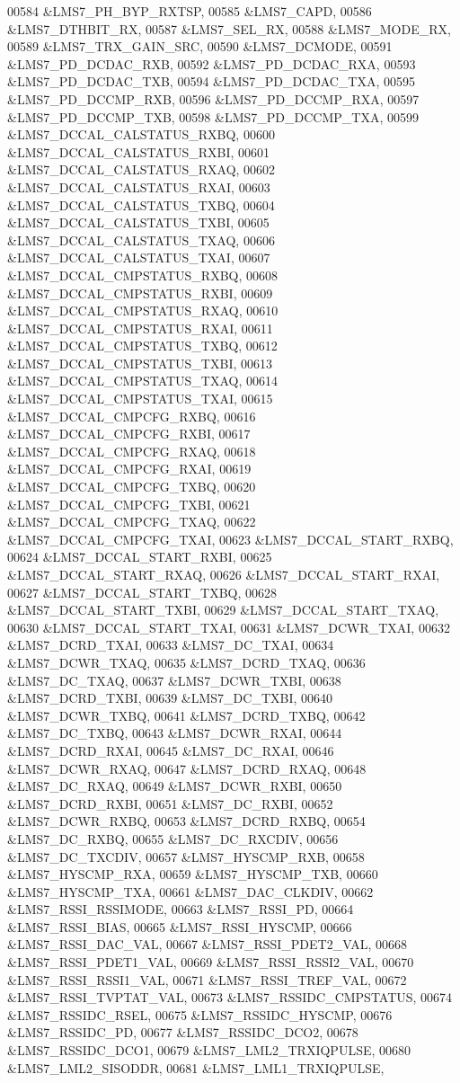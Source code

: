 \begin{DoxyCode}
00584 &LMS7_PH_BYP_RXTSP,
00585 &LMS7_CAPD,
00586 &LMS7_DTHBIT_RX,
00587 &LMS7_SEL_RX,
00588 &LMS7_MODE_RX,
00589 &LMS7_TRX_GAIN_SRC,
00590 &LMS7_DCMODE,
00591 &LMS7_PD_DCDAC_RXB,
00592 &LMS7_PD_DCDAC_RXA,
00593 &LMS7_PD_DCDAC_TXB,
00594 &LMS7_PD_DCDAC_TXA,
00595 &LMS7_PD_DCCMP_RXB,
00596 &LMS7_PD_DCCMP_RXA,
00597 &LMS7_PD_DCCMP_TXB,
00598 &LMS7_PD_DCCMP_TXA,
00599 &LMS7_DCCAL_CALSTATUS_RXBQ,
00600 &LMS7_DCCAL_CALSTATUS_RXBI,
00601 &LMS7_DCCAL_CALSTATUS_RXAQ,
00602 &LMS7_DCCAL_CALSTATUS_RXAI,
00603 &LMS7_DCCAL_CALSTATUS_TXBQ,
00604 &LMS7_DCCAL_CALSTATUS_TXBI,
00605 &LMS7_DCCAL_CALSTATUS_TXAQ,
00606 &LMS7_DCCAL_CALSTATUS_TXAI,
00607 &LMS7_DCCAL_CMPSTATUS_RXBQ,
00608 &LMS7_DCCAL_CMPSTATUS_RXBI,
00609 &LMS7_DCCAL_CMPSTATUS_RXAQ,
00610 &LMS7_DCCAL_CMPSTATUS_RXAI,
00611 &LMS7_DCCAL_CMPSTATUS_TXBQ,
00612 &LMS7_DCCAL_CMPSTATUS_TXBI,
00613 &LMS7_DCCAL_CMPSTATUS_TXAQ,
00614 &LMS7_DCCAL_CMPSTATUS_TXAI,
00615 &LMS7_DCCAL_CMPCFG_RXBQ,
00616 &LMS7_DCCAL_CMPCFG_RXBI,
00617 &LMS7_DCCAL_CMPCFG_RXAQ,
00618 &LMS7_DCCAL_CMPCFG_RXAI,
00619 &LMS7_DCCAL_CMPCFG_TXBQ,
00620 &LMS7_DCCAL_CMPCFG_TXBI,
00621 &LMS7_DCCAL_CMPCFG_TXAQ,
00622 &LMS7_DCCAL_CMPCFG_TXAI,
00623 &LMS7_DCCAL_START_RXBQ,
00624 &LMS7_DCCAL_START_RXBI,
00625 &LMS7_DCCAL_START_RXAQ,
00626 &LMS7_DCCAL_START_RXAI,
00627 &LMS7_DCCAL_START_TXBQ,
00628 &LMS7_DCCAL_START_TXBI,
00629 &LMS7_DCCAL_START_TXAQ,
00630 &LMS7_DCCAL_START_TXAI,
00631 &LMS7_DCWR_TXAI,
00632 &LMS7_DCRD_TXAI,
00633 &LMS7_DC_TXAI,
00634 &LMS7_DCWR_TXAQ,
00635 &LMS7_DCRD_TXAQ,
00636 &LMS7_DC_TXAQ,
00637 &LMS7_DCWR_TXBI,
00638 &LMS7_DCRD_TXBI,
00639 &LMS7_DC_TXBI,
00640 &LMS7_DCWR_TXBQ,
00641 &LMS7_DCRD_TXBQ,
00642 &LMS7_DC_TXBQ,
00643 &LMS7_DCWR_RXAI,
00644 &LMS7_DCRD_RXAI,
00645 &LMS7_DC_RXAI,
00646 &LMS7_DCWR_RXAQ,
00647 &LMS7_DCRD_RXAQ,
00648 &LMS7_DC_RXAQ,
00649 &LMS7_DCWR_RXBI,
00650 &LMS7_DCRD_RXBI,
00651 &LMS7_DC_RXBI,
00652 &LMS7_DCWR_RXBQ,
00653 &LMS7_DCRD_RXBQ,
00654 &LMS7_DC_RXBQ,
00655 &LMS7_DC_RXCDIV,
00656 &LMS7_DC_TXCDIV,
00657 &LMS7_HYSCMP_RXB,
00658 &LMS7_HYSCMP_RXA,
00659 &LMS7_HYSCMP_TXB,
00660 &LMS7_HYSCMP_TXA,
00661 &LMS7_DAC_CLKDIV,
00662 &LMS7_RSSI_RSSIMODE,
00663 &LMS7_RSSI_PD,
00664 &LMS7_RSSI_BIAS,
00665 &LMS7_RSSI_HYSCMP,
00666 &LMS7_RSSI_DAC_VAL,
00667 &LMS7_RSSI_PDET2_VAL,
00668 &LMS7_RSSI_PDET1_VAL,
00669 &LMS7_RSSI_RSSI2_VAL,
00670 &LMS7_RSSI_RSSI1_VAL,
00671 &LMS7_RSSI_TREF_VAL,
00672 &LMS7_RSSI_TVPTAT_VAL,
00673 &LMS7_RSSIDC_CMPSTATUS,
00674 &LMS7_RSSIDC_RSEL,
00675 &LMS7_RSSIDC_HYSCMP,
00676 &LMS7_RSSIDC_PD,
00677 &LMS7_RSSIDC_DCO2,
00678 &LMS7_RSSIDC_DCO1,
00679 &LMS7_LML2_TRXIQPULSE,
00680 &LMS7_LML2_SISODDR,
00681 &LMS7_LML1_TRXIQPULSE,

\end{DoxyCode}
